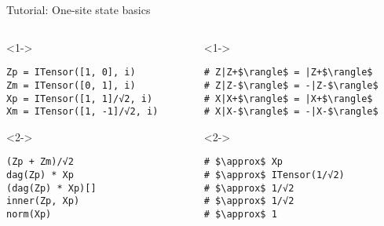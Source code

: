 \begin{frame}[fragile]{Tutorial: One-site state basics}

\begin{columns}

\begin{column}{4.5cm}

\begin{onlyenv}<1->

\begin{lstlisting}[language=JuliaLocal, style=julia, basicstyle=\small]
Zp = ITensor([1, 0], i)
Zm = ITensor([0, 1], i)
Xp = ITensor([1, 1]/√2, i) 
Xm = ITensor([1, -1]/√2, i) 
\end{lstlisting}

\end{onlyenv}

\begin{onlyenv}<2->

\begin{lstlisting}[language=JuliaLocal, style=julia, basicstyle=\small]
(Zp + Zm)/√2
dag(Zp) * Xp
(dag(Zp) * Xp)[]
inner(Zp, Xp)
norm(Xp)
\end{lstlisting}

\end{onlyenv}

\end{column}

\begin{column}{4.5cm}

\begin{onlyenv}<1->

\begin{lstlisting}[style=julia, numbers=none, mathescape, basicstyle=\small]
# Z|Z+$\rangle$ = |Z+$\rangle$
# Z|Z-$\rangle$ = -|Z-$\rangle$
# X|X+$\rangle$ = |X+$\rangle$
# X|X-$\rangle$ = -|X-$\rangle$
\end{lstlisting}

\end{onlyenv}

\begin{onlyenv}<2->

\begin{lstlisting}[style=julia, numbers=none, mathescape, basicstyle=\small]
# $\approx$ Xp
# $\approx$ ITensor(1/√2)
# $\approx$ 1/√2
# $\approx$ 1/√2
# $\approx$ 1
\end{lstlisting}

\end{onlyenv}

\end{column}

\end{columns}

\end{frame}
